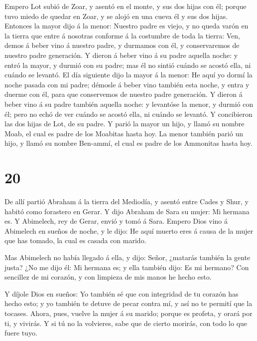 Empero Lot subió de Zoar, y asentó en el monte, y sus dos
hijas con él; porque tuvo miedo de quedar en Zoar, y se alojó en una
cueva él y sus dos hijas.  Entonces la mayor dijo á la
menor: Nuestro padre es viejo, y no queda varón en la tierra que entre á
nosotras conforme á la costumbre de toda la tierra:  Ven,
demos á beber vino á nuestro padre, y durmamos con él, y conservaremos
de nuestro padre generación.  Y dieron á beber vino á su
padre aquella noche: y entró la mayor, y durmió con su padre; mas él no
sintió cuándo se acostó ella, ni cuándo se levantó.  El día
siguiente dijo la mayor á la menor: He aquí yo dormí la noche pasada con
mi padre; démosle á beber vino también esta noche, y entra y duerme con
él, para que conservemos de nuestro padre generación.  Y
dieron á beber vino á su padre también aquella noche: y levantóse la
menor, y durmió con él; pero no echó de ver cuándo se acostó ella, ni
cuándo se levantó.  Y concibieron las dos hijas de Lot, de
su padre.  Y parió la mayor un hijo, y llamó su nombre
Moab, el cual es padre de los Moabitas hasta hoy.  La menor
también parió un hijo, y llamó su nombre Ben-ammí, el cual es padre de
los Ammonitas hasta hoy.

\hypertarget{section-19}{%
\section{20}\label{section-19}}

 De allí partió Abraham á la tierra del Mediodía, y asentó
entre Cades y Shur, y habitó como forastero en Gerar.  Y
dijo Abraham de Sara su mujer: Mi hermana es. Y Abimelech, rey de Gerar,
envió y tomó á Sara.  Empero Dios vino á Abimelech en sueños
de noche, y le dijo: He aquí muerto eres á causa de la mujer que has
tomado, la cual es casada con marido.

 Mas Abimelech no había llegado á ella, y dijo: Señor,
¿matarás también la gente justa?  ¿No me dijo él: Mi hermana
es; y ella también dijo: Es mi hermano? Con sencillez de mi corazón, y
con limpieza de mis manos he hecho esto.

 Y díjole Dios en sueños: Yo también sé que con integridad
de tu corazón has hecho esto; y yo también te detuve de pecar contra mí,
y así no te permití que la tocases.  Ahora, pues, vuelve la
mujer á su marido; porque es profeta, y orará por ti, y vivirás. Y si tú
no la volvieres, sabe que de cierto morirás, con todo lo que fuere tuyo.

